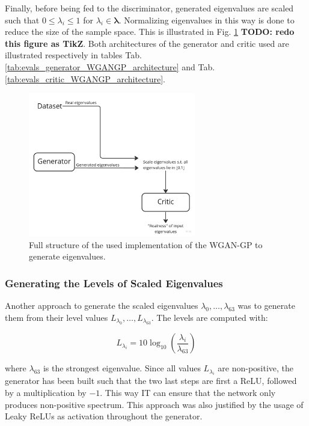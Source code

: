 \documentclass[11pt,a4paper,twoside]{report}
\begin{document}
Finally, before being fed to the discriminator, generated eigenvalues are scaled such that $0 \leq \lambda_i \leq 1$ for $\lambda_i \in \mathbf{\lambda}$. Normalizing eigenvalues in this way is done to reduce the size of the sample space. This is illustrated in Fig. \ref{fig:flowchart_evals_wgangp} \textbf{TODO: redo this figure as TikZ}. Both architectures of the generator and critic used are illustrated respectively in tables Tab.\ref{tab:evals_generator_WGANGP_architecture} and Tab.\ref{tab:evals_critic_WGANGP_architecture}.

\begin{figure}
    \centering
    \includegraphics[width=0.65\textwidth]{figs/flowchart_evals_wgangp.jpg}
    \caption{Full structure of the used implementation of the WGAN-GP to generate eigenvalues.}
    \label{fig:flowchart_evals_wgangp}
\end{figure}



\subsubsection{Generating the Levels of Scaled Eigenvalues}

Another approach to generate the scaled eigenvalues $\lambda_0, \dots, \lambda_{63}$ was to generate them from their level values $ L_{\lambda_0} , \dots,  L_{\lambda_{63}} $. The levels are computed with:

\begin{equation}
    L_{\lambda_i} = 10 \log_{10}(\frac{\lambda_i}{\lambda_{63}})
\end{equation}

where $\lambda_{63}$ is the strongest eigenvalue.  Since all values $L_{\lambda_i}$ are non-positive, the generator has been built such that the two last steps are first a ReLU, followed by a multiplication by $-1$. This way IT can ensure that the network only produces non-positive spectrum. This approach was also justified by the usage of Leaky ReLUs as activation throughout the generator. 
\end{document}
